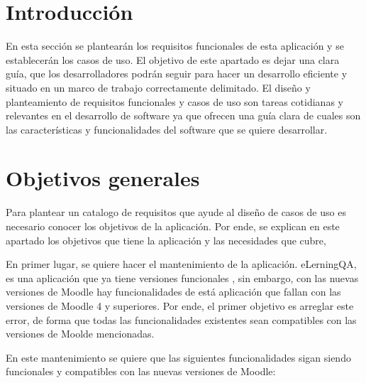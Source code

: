 
\section{Introducción}
En esta sección se plantearán los requisitos funcionales de esta aplicación y se establecerán los casos de uso. El objetivo de este apartado es dejar una clara guía, que los desarrolladores podrán seguir para hacer un desarrollo eficiente y situado en un marco de trabajo correctamente delimitado. El diseño y planteamiento de requisitos funcionales y casos de uso son tareas cotidianas y relevantes en el desarrollo de software ya que ofrecen una guía clara de cuales son las características y funcionalidades del software que se quiere desarrollar.

\section{Objetivos generales}
Para plantear un catalogo de requisitos que ayude al diseño de casos de uso es necesario conocer los objetivos de la aplicación. Por ende, se explican en este apartado los objetivos que tiene la aplicación y las necesidades que cubre,

En primer lugar, se quiere hacer el mantenimiento de la aplicación. eLerningQA, es una aplicación que ya tiene versiones funcionales \cite{tfg-robertoArasti}, sin embargo, con las nuevas versiones de Moodle hay funcionalidades de está aplicación que fallan con las versiones de Moodle 4 y superiores. Por ende, el primer objetivo es arreglar este error, de forma que todas las funcionalidades existentes sean compatibles con las versiones de Moolde mencionadas. 

En este mantenimiento se quiere que las siguientes funcionalidades sigan siendo funcionales y compatibles con las nuevas versiones de Moodle:

